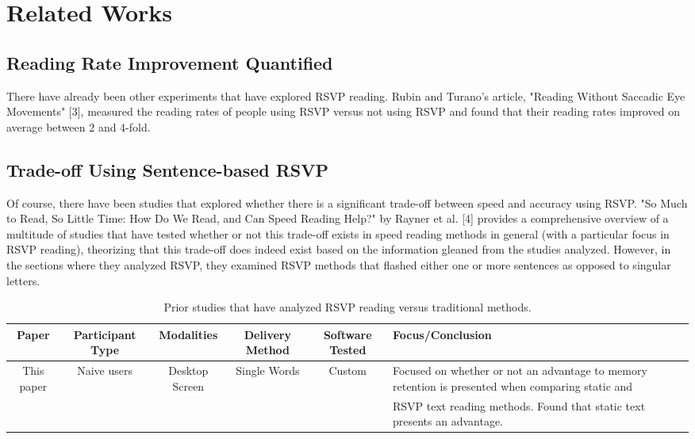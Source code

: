\documentclass[manuscript,screen]{acmart}
\begin{document}
\section{Related Works}
\subsection{Reading Rate Improvement Quantified}
There have already been other experiments that have explored RSVP reading. Rubin and Turano's article, "Reading Without Saccadic Eye Movements" [3], measured the reading rates of people using RSVP versus not using RSVP and found that their reading rates improved on average between 2 and 4-fold.

\subsection{Trade-off Using Sentence-based RSVP}
Of course, there have been studies that explored whether there is a significant trade-off between speed and accuracy using RSVP. "So Much to Read, So Little Time: How Do We Read, and Can Speed Reading Help?" by Rayner et al. [4] provides a comprehensive overview of a multitude of studies that have tested whether or not this trade-off exists in speed reading methods in general (with a particular focus in RSVP reading), theorizing that this trade-off does indeed exist based on the information gleaned from the studies analyzed. However, in the sections where they analyzed RSVP, they examined RSVP methods that flashed either one or more sentences as opposed to singular letters.

\begin{table}[htbp]
  \caption{Prior studies that have analyzed RSVP reading versus traditional methods.}
  \label{tab:freq}
  \tiny
  \begin{tabular}{cccccl}
    \toprule
    \textbf{Paper} & \textbf{Participant Type} & \textbf{Modalities} & \textbf{Delivery Method} & \textbf{Software Tested} & \textbf{Focus/Conclusion} \\
    \midrule
    This paper & Naive users & Desktop Screen & Single Words & Custom & Focused on whether or not an advantage to memory retention is presented when comparing static and\\ &&&&& RSVP text reading methods. Found that static text presents an advantage. \\
    \bottomrule
  \end{tabular}
\end{table}
\end{document}
